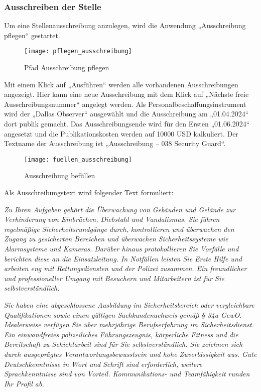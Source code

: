 \subsubsection{Ausschreiben der Stelle}
Um eine Stellenausschreibung anzulegen, wird die Anwendung „Ausschreibung pflegen“ gestartet.
\begin{figure}[H]
	\centering
	\texttt{[image: pflegen\_ausschreibung]}
	\caption{Pfad Ausschreibung pflegen}
	\label{fig:pflegen_ausschreibung}
\end{figure}
Mit einem Klick auf „Ausführen“ werden alle vorhandenen Ausschreibungen angezeigt. Hier kann eine neue Ausschreibung mit dem Klick auf „Nächste freie Ausschreibungsnummer“ angelegt werden. Als Personalbeschaffungsinstrument wird der „Dallas Observer“ ausgewählt und die Ausschreibung am „01.04.2024“ dort publik gemacht. Das Ausschreibungsende wird für den Ersten „01.06.2024“ angesetzt und die Publikationskosten werden auf 10000 USD kalkuliert. Der Textname der Ausschreibung ist „Ausschreibung – 038 Security Guard“.
\begin{figure}[H]
	\centering
	\texttt{[image: fuellen\_ausschreibung]}
	\caption{Ausschreibung befüllen}
	\label{fig:fuellen_ausschreibung}
\end{figure}
Als Ausschreibungstext wird folgender Text formuliert:

\textsl{
	Zu Ihren Aufgaben gehört die Überwachung von Gebäuden und Gelände zur Verhinderung von Einbrüchen, Diebstahl und Vandalismus. Sie führen regelmäßige Sicherheitsrundgänge durch, kontrollieren und überwachen den Zugang zu gesicherten Bereichen und überwachen Sicherheitssysteme wie Alarmsysteme und Kameras. Darüber hinaus protokollieren Sie Vorfälle und berichten diese an die Einsatzleitung. In Notfällen leisten Sie Erste Hilfe und arbeiten eng mit Rettungsdiensten und der Polizei zusammen. Ein freundlicher und professioneller Umgang mit Besuchern und Mitarbeitern ist für Sie selbstverständlich.
}

\textsl{
	Sie haben eine abgeschlossene Ausbildung im Sicherheitsbereich oder vergleichbare Qualifikationen sowie einen gültigen Sachkundenachweis gemäß § 34a GewO. Idealerweise verfügen Sie über mehrjährige Berufserfahrung im Sicherheitsdienst. Ein einwandfreies polizeiliches Führungszeugnis, körperliche Fitness und die Bereitschaft zu Schichtarbeit sind für Sie selbstverständlich. Sie zeichnen sich durch ausgeprägtes Verantwortungsbewusstsein und hohe Zuverlässigkeit aus. Gute Deutschkenntnisse in Wort und Schrift sind erforderlich, weitere Sprachkenntnisse sind von Vorteil. Kommunikations- und Teamfähigkeit runden Ihr Profil ab.
}


